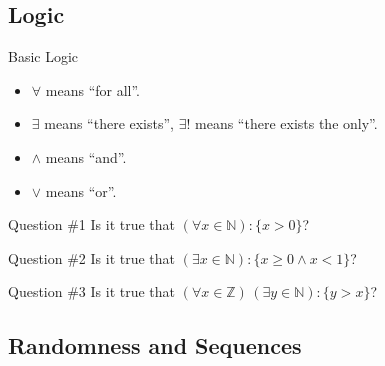 \documentclass{zkdl-presentation-template}
\begin{document}
    \subsection{Logic}
    \begin{frame}{Basic Logic}
        \begin{itemize}
          \item $\forall$ means ``for all''.
          \item $\exists$ means ``there exists'', $\exists!$ means ``there exists the only''.
          \item $\land$ means ``and''.
          \item $\lor$ means ``or''.\pause
        \end{itemize}

        \begin{questionblock}{Question \#1}
            Is it true that $(\forall x \in \mathbb{N}): \{x > 0\}$?\pause
        \end{questionblock}

        \begin{questionblock}{Question \#2}
            Is it true that $(\exists x \in \mathbb{N}): \{x \geq 0 \land x < 1\}$?\pause
        \end{questionblock}

        \begin{questionblock}{Question \#3}
            Is it true that $(\forall x \in \mathbb{Z})\, (\exists y \in \mathbb{N}): \{y > x\}$?
        \end{questionblock}
    \end{frame}

    \subsection{Randomness and Sequences}
\end{document}
